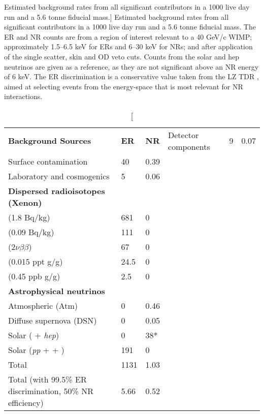 \begin{table}[]
\centering
\caption
[Estimated background rates from all significant contributors in a 1000 live day run and a 5.6 tonne fiducial mass.]
{Estimated background rates from all significant contributors in a 1000 live day run and a 5.6 tonne fiducial mass. The ER and NR counts are from a region of interest relevant to a 40 GeV/c\squared{} WIMP; approximately 1.5--6.5 keV for ERs and 6--30 keV for NRs; and after application of the single scatter, skin and OD veto cuts. Counts from the solar \BE{} and hep neutrinos are given as a reference, as they are not significant above an NR energy of 6 keV. The ER discrimination is a conservative value taken from the LZ TDR \cite{lz_tdr}, aimed at selecting events from the energy-space that is most relevant for NR interactions.}
\label{tab:lz_background_count}
\vspace{1mm}
\renewcommand{\arraystretch}{1.2}
    \begin{tabularx}{1.0\linewidth}{@{\extracolsep{\fill}}lll}
    \toprule
    \textbf{Background Sources} & %
    \textbf{ER} & %
    \textbf{NR} & %
    \hline
    \hline

    Detector components                         & 9    & 0.07 \\
    Surface contamination                       & 40   & 0.39 \\
    Laboratory and cosmogenics                  & 5    & 0.06 \\
    \textbf{Dispersed radioisotopes (Xenon)}    &      &      \\
    \RnTTT{} (1.8 \micro{}Bq/kg)                & 681  & 0    \\
    \RnTTZ{} (0.09 \micro{}Bq/kg)               & 111  & 0    \\
    \XeOTS{} ($2\nu\beta\beta$)                 & 67   & 0    \\
    \KrEF{} (0.015 ppt g/g)                     & 24.5 & 0    \\
    \ArTN{} (0.45 ppb g/g)                      & 2.5  & 0    \\
    \textbf{Astrophysical neutrinos}            &      &      \\
    Atmospheric (Atm)                           & 0    & 0.46 \\
    Diffuse supernova (DSN)                     & 0    & 0.05 \\
    Solar (\BE{} + \textit{hep})                & 0    & 38*  \\
    Solar (\textit{pp} + \BeS{} + \NOT{})        & 191  & 0    \\
    \hline
    Total                                                       & 1131 & 1.03 \\
    Total (with 99.5\% ER discrimination, 50\% NR efficiency)   & 5.66 & 0.52 \\
    
    \bottomrule
    \end{tabularx}
\end{table}